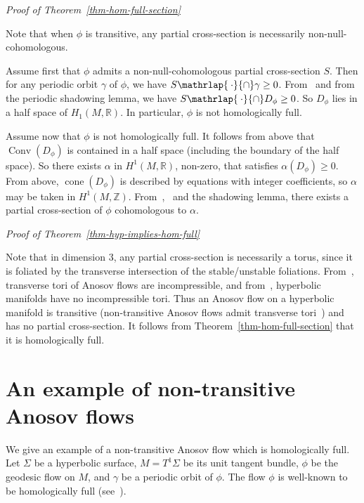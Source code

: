 \documentclass[colorinlistoftodos,12pt]{article}
\makeatletter
\newcommand{\RR}{\mathbb{R}}
\newcommand{\ZZ}{\mathbb{Z}}
\newcommand{\algcap}{\mathrlap{\hspace{2.3pt}\cdot}{\cap}}
\DeclareMathOperator{\cone}{cone}
\DeclareMathOperator{\conv}{Conv}
\theoremstyle{colorplain}
\numberwithin{theorem}{section}
\theoremstyle{colorremarkbis}
\theoremstyle{colorremark}
\theoremstyle{colordefinition}
\renewenvironment{proof}[1][Proof]{
    \setcounter{claim}{0}    
    \setcounter{claimproof}{0}    
    \par
    \pushQED{\qed}%
    \normalfont\topsep6\p@\@plus6\p@\relax
    \trivlist
    \item\relax
    {\itshape\color{RoyalPurple}#1\@addpunct{.}}\hspace\labelsep\ignorespaces
}{%
    \popQED\endtrivlist\@endpefalse
}
\newcounter{claimproof} %
\makeatother
\begin{document}
\begin{proof}[Proof of Theorem~\ref{thm-hom-full-section}]
	Note that when $\phi$ is transitive, any partial cross-section is necessarily non-null-cohomologous.

	Assume first that $\phi$ admits a non-null-cohomologous partial cross-section $S$. Then for any periodic orbit $\gamma$ of $\phi$, we have $S\algcap\gamma\geq 0$. From~\cite[Lemma 3.6]{marty2025partialI} and from the periodic shadowing lemma, we have $S\algcap D_\phi\geq0$. So $D_\phi$ lies in a half space of $H_1(M,\RR)$. In particular, $\phi$ is not homologically full.
	
	Assume now that $\phi$ is not homologically full. 
	It follows from above that $\conv(D_\phi)$ is contained in a half space (including the boundary of the half space). So there exists $\alpha$ in $H^1(M,\RR)$, non-zero, that satisfies $\alpha(D_\phi)\geq0$. From above, $\cone(D_\phi)$ is described by equations with integer coefficients, so $\alpha$ may be taken in $H^1(M,\ZZ)$. 
	From~\cite[Theorem A]{marty2025partialII},~\cite[Lemma 3.6]{marty2025partialI} and the shadowing lemma, there exists a partial cross-section of $\phi$ cohomologous to $\alpha$.
\end{proof}


\begin{proof}[Proof of Theorem~\ref{thm-hyp-implies-hom-full}]
	Note that in dimension 3, any partial cross-section is necessarily a torus, since it is foliated by the transverse intersection of the stable/unstable foliations. From~\cite{brunella1993separating}, transverse tori of Anosov flows are incompressible, and from~\cite[Theorem 9]{preissmann1942quelques}, hyperbolic manifolds have no incompressible tori. Thus an Anosov flow on a hyperbolic manifold is transitive (non-transitive Anosov flows admit transverse tori~\cite{brunella1993separating}) and has no partial cross-section. It follows from Theorem~\ref{thm-hom-full-section} that it is homologically full.
\end{proof}




\section{An example of non-transitive Anosov flows}\label{sec-example}


We give an example of a non-transitive Anosov flow which is homologically full.
Let $\Sigma$ be a hyperbolic surface, $M=T^1\Sigma$ be its unit tangent bundle, $\phi$ be the geodesic flow on $M$, and $\gamma$ be a periodic orbit of $\phi$. The flow $\phi$ is well-known to be homologically full (see~\cite[Lemma 5]{marty2025skewed}).
\end{document}

